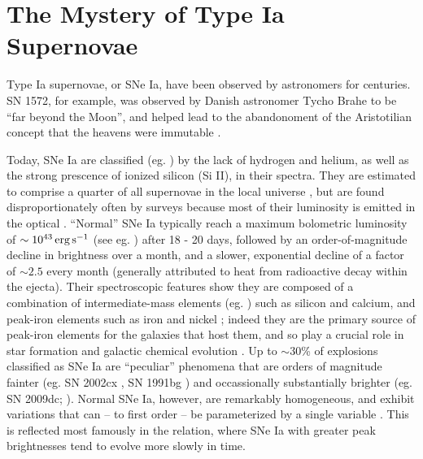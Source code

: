 \section{The Mystery of Type Ia Supernovae}


Type Ia supernovae, or SNe Ia, have been observed by astronomers for centuries.  SN 1572, for example, was observed by Danish astronomer Tycho Brahe to be ``far beyond the Moon'', and helped lead to the abandonoment of the Aristotilian concept that the heavens were immutable \citep{ruiz04, krau+08}.

Today, SNe Ia are classified (eg. \citealt{fili97, li+11}) by the lack of hydrogen and helium, as well as the strong prescence of ionized silicon (Si II), in their spectra.  They are estimated to comprise a quarter of all supernovae in the local universe \citep{li+11}, but are found disproportionately often by surveys because most of their luminosity is emitted in the optical \citep{howe11}.  ``Normal'' SNe Ia \citep{bran98, bran+06} typically reach a maximum bolometric luminosity of $\sim10^{43}\,\ergpsec$ (see eg. \citep{fili97, hill+13}) after 18 - 20 days, followed by an order-of-magnitude decline in brightness over a month, and a slower, exponential decline of a factor of $\sim2.5$ every month (generally attributed to heat from radioactive decay within the ejecta).  Their spectroscopic features show they are composed of a combination of intermediate-mass elements (eg. \citealt{arne96}) such as silicon and calcium, and peak-iron elements such as iron and nickel \citep{fili97}; indeed they are the primary source of peak-iron elements for the galaxies that host them, and so play a crucial role in star formation and galactic chemical evolution \citep{leib00}.  Up to $\sim30$\% \citep{li+11} of explosions classified as SNe Ia are ``peculiar'' phenomena that are orders of magnitude fainter (eg. SN 2002cx \citep{li+02, fole+13}, SN 1991bg \citep{mazz+97}) and occassionally substantially brighter (eg. SN 2009dc; \citealt{yama+09, taub+09}).  Normal SNe Ia, however, are remarkably homogeneous, and exhibit variations that can -- to first order -- be parameterized by a single variable \citep{hilln00, howe11, moazns14}.  This is reflected most famously in the \cite{phil93} relation, where SNe Ia with greater peak brightnesses tend to evolve more slowly in time.  

